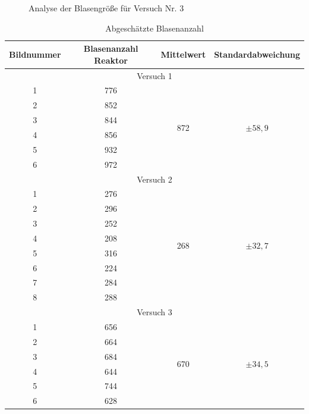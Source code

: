 \documentclass[12pt,liststotoc]{report}
\begin{document}
\begin{figure}[H]
\begin{center}
	\hspace{1cm}
	\label{blasengroesse36}
	\caption{Analyse der Blasengröße für Versuch Nr. 3}
	\label{blasengroesseversuch3}
\end{center}	
\end{figure}
\noindent

\begin{table}[H]
  \centering
  \caption{Abgeschätzte Blasenanzahl}
    \begin{tabular}{cccc}
    \toprule
    Bildnummer & Blasenanzahl Reaktor & Mittelwert & Standardabweichung \\
    \midrule
    \multicolumn{4}{c}{Versuch 1}\\
    \midrule
    1&776&\multirow{6}{*}{872}&\multirow{6}{*}{$\pm 58,9$}\\
    2&852&&\\
    3&844&&\\
    4&856&&\\
    5&932&&\\
    6&972&&\\
    \midrule
    \multicolumn{4}{c}{Versuch 2}\\
    \midrule
    1&276&\multirow{8}{*}{268}&\multirow{8}{*}{$\pm 32,7$}\\
    2&296&&\\
    3&252&&\\
    4&208&&\\
    5&316&&\\
    6&224&&\\
    7&284&&\\
    8&288&&\\
    \midrule
    \multicolumn{4}{c}{Versuch 3}\\
    \midrule
    1&656&\multirow{6}{*}{670}&\multirow{6}{*}{$\pm 34,5$}\\
    2&664&&\\
    3&684&&\\
    4&644&&\\
    5&744&&\\
    6&628&&\\   
    \bottomrule
    \end{tabular}
  \label{tab:Blasenanzahl}
\end{table}
\end{document}
